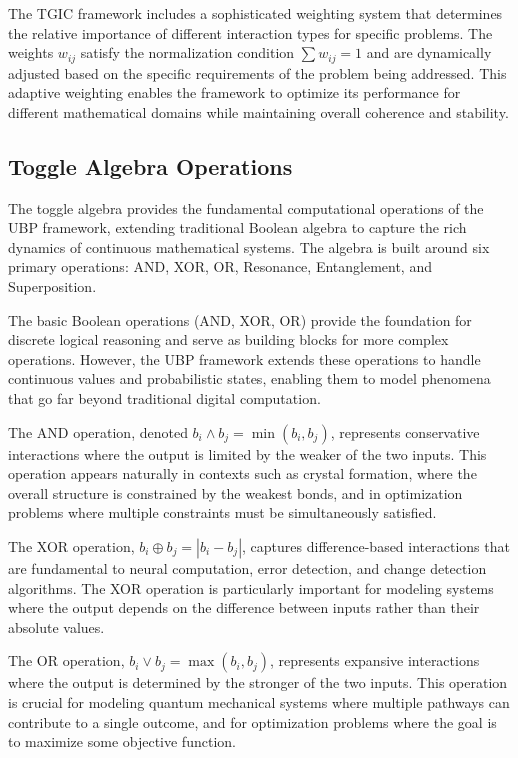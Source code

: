 \documentclass[11pt]{amsart}
\begin{document}
The TGIC framework includes a sophisticated weighting system that determines the relative importance of different interaction types for specific problems. The weights $w_{ij}$ satisfy the normalization condition $\sum w_{ij} = 1$ and are dynamically adjusted based on the specific requirements of the problem being addressed. This adaptive weighting enables the framework to optimize its performance for different mathematical domains while maintaining overall coherence and stability.

\subsection{Toggle Algebra Operations}

The toggle algebra provides the fundamental computational operations of the UBP framework, extending traditional Boolean algebra to capture the rich dynamics of continuous mathematical systems. The algebra is built around six primary operations: AND, XOR, OR, Resonance, Entanglement, and Superposition.

The basic Boolean operations (AND, XOR, OR) provide the foundation for discrete logical reasoning and serve as building blocks for more complex operations. However, the UBP framework extends these operations to handle continuous values and probabilistic states, enabling them to model phenomena that go far beyond traditional digital computation.

The AND operation, denoted $b_i \land b_j = \min(b_i, b_j)$, represents conservative interactions where the output is limited by the weaker of the two inputs. This operation appears naturally in contexts such as crystal formation, where the overall structure is constrained by the weakest bonds, and in optimization problems where multiple constraints must be simultaneously satisfied.

The XOR operation, $b_i \oplus b_j = |b_i - b_j|$, captures difference-based interactions that are fundamental to neural computation, error detection, and change detection algorithms. The XOR operation is particularly important for modeling systems where the output depends on the difference between inputs rather than their absolute values.

The OR operation, $b_i \lor b_j = \max(b_i, b_j)$, represents expansive interactions where the output is determined by the stronger of the two inputs. This operation is crucial for modeling quantum mechanical systems where multiple pathways can contribute to a single outcome, and for optimization problems where the goal is to maximize some objective function.
\end{document}
